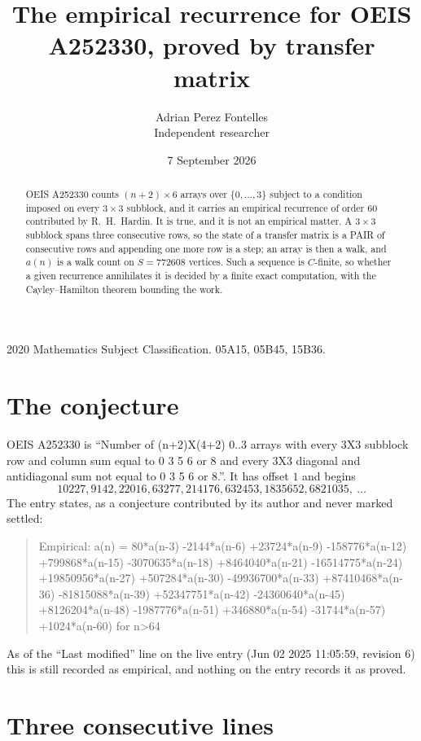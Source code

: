 \documentclass[11pt,a4paper]{article}
\title{The empirical recurrence for OEIS A252330, proved by transfer matrix}
\author{Adrian Perez Fontelles\\ \small Independent researcher}
\date{7 September 2026}
\theoremstyle{plain}
\theoremstyle{definition}
\begin{document}
\maketitle

\begin{abstract}
OEIS A252330 counts $(n+2)\times6$ arrays over $\{0,\dots,3\}$ subject to a condition imposed on
every $3\times3$ subblock, and it carries an empirical recurrence of order $60$
contributed by R.~H.~Hardin. It is true, and it is not an empirical matter. A $3\times3$
subblock spans three consecutive rows, so the state of a transfer matrix is a PAIR of
consecutive rows and appending one more row is a step; an array is then a walk, and
$a(n)$ is a walk count on $S=772608$ vertices. Such a sequence is $C$-finite, so whether a given
recurrence annihilates it is decided by a finite exact computation, with the Cayley--Hamilton
theorem bounding the work.
\end{abstract}

\noindent\small 2020 Mathematics Subject Classification. 05A15, 05B45, 15B36.\normalsize

\section{The conjecture}

OEIS A252330 is ``Number of (n+2)X(4+2) 0..3 arrays with every 3X3 subblock row and column sum equal to 0 3 5 6 or 8 and every 3X3 diagonal and antidiagonal sum not equal to 0 3 5 6 or 8.''. It has offset $1$ and begins
\[
10227, 9142, 22016, 63277, 214176, 632453, 1835652, 6821035,\ \dots
\]
The entry states, as a conjecture contributed by its author and never marked settled:
\begin{quote}
Empirical: a(n) = 80*a(n-3) -2144*a(n-6) +23724*a(n-9) -158776*a(n-12) +799868*a(n-15) -3070635*a(n-18) +8464040*a(n-21) -16514775*a(n-24) +19850956*a(n-27) +507284*a(n-30) -49936700*a(n-33) +87410468*a(n-36) -81815088*a(n-39) +52347751*a(n-42) -24360640*a(n-45) +8126204*a(n-48) -1987776*a(n-51) +346880*a(n-54) -31744*a(n-57) +1024*a(n-60) for n>64
\end{quote}
As of the ``Last modified'' line on the live entry (Jun 02 2025 11:05:59, revision 6) this is still
recorded as empirical, and nothing on the entry records it as proved.

\section{Three consecutive lines}
\end{document}
